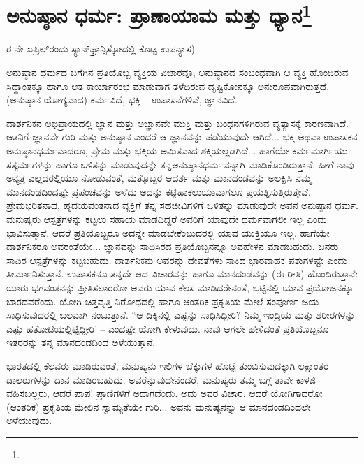 
\chapter[ಅನುಷ್ಠಾನ ಧರ್ಮ: ಪ್ರಾಣಾಯಾಮ ಮತ್ತು ಧ್ಯಾನ]{ಅನುಷ್ಠಾನ ಧರ್ಮ: ಪ್ರಾಣಾಯಾಮ ಮತ್ತು ಧ್ಯಾನ\protect\footnote{}}

\begin{center}
ರ ನೇ ಏಪ್ರಿಲ್‌ರಂದು ಸ್ಯಾನ್‌ಫ್ರಾನ್ಸಿಸ್ಕೋದಲ್ಲಿ ಕೊಟ್ಟ ಉಪನ್ಯಾಸ)
\end{center}

ಅನುಷ್ಠಾನ ಧರ್ಮದ ಬಗೆಗಿನ ಪ್ರತಿಯೊಬ್ಬ ವ್ಯಕ್ತಿಯ ವಿಚಾರವೂ, ಅನುಷ್ಠಾನದ ಸಂಬಂಧವಾಗಿ ಆ ವ್ಯಕ್ತಿ ಹೊಂದಿರುವ ಸಿದ್ದಾಂತಕ್ಕೂ ಹಾಗೂ ಆತ ಕಾರ್ಯಾರಂಭ ಮಾಡುವಾಗ ತಳೆದಿರುವ ದೃಷ್ಟಿಕೋನಕ್ಕೂ ಅನುರೂಪವಾಗಿರುತ್ತದೆ. (ಅನುಷ್ಠಾನ ಯೋಗ್ಯವಾದ) ಕರ್ಮವಿದೆ, ಭಕ್ತಿ – ಉಪಾಸನೆಗಳಿವೆ, ಜ್ಞಾನವಿದೆ.

ದಾರ್ಶನಿಕನ ಅಭಿಪ್ರಾಯದಲ್ಲಿ ಜ್ಞಾನ ಮತ್ತು ಅಜ್ಞಾನವೇ ಮುಕ್ತಿ ಮತ್ತು ಬಂಧನಗಳಿಗಿರುವ ವ್ಯತ್ಯಾಸಕ್ಕೆ ಕಾರಣವಾಗಿದೆ. ಆತನಿಗೆ ಜ್ಞಾನವೇ ಗುರಿ ಮತ್ತು ಅನುಷ್ಠಾನ ಎಂದರೆ ಆ ಜ್ಞಾನವನ್ನು ಪಡೆಯುವುದೇ ಆಗಿದೆ... ಭಕ್ತ ಅಥವಾ ಉಪಾಸಕನ ಅನುಷ್ಠಾನಧರ್ಮವಾದರೂ, ಪ್ರೇಮ ಮತ್ತು ಭಕ್ತಿಯ ಅಮಿತವಾದ ಶಕ್ತಿಯಲ್ಲಡಗಿದೆ... ಹಾಗೆಯೇ ಕರ್ಮಮಾರ್ಗಿಯು ಸತ್ಕರ್ಮಗಳನ್ನು ಹಾಗೂ ಒಳಿತನ್ನು ಮಾಡುವುದನ್ನೇ ತನ್ನ\break ಅನುಷ್ಠಾನಧರ್ಮವನ್ನಾಗಿ ಮಾಡಿಕೊಂಡಿರುತ್ತಾನೆ. ಹೀಗೆ ನಾವು ಅನ್ಯತ್ರ ಎಲ್ಲದರಲ್ಲಿಯೂ ನೋಡುವಂತೆ, ಮತ್ತೊಬ್ಬರ ಆದರ್ಶ ಮತ್ತು ಮಾನದಂಡವನ್ನು ಅಲಕ್ಷಿಸಿ ನಮ್ಮ ಮಾನದಂಡದಿಂದಷ್ಟೇ ಪ್ರಪಂಚವನ್ನು ಅಳೆದು ಅದನ್ನು ಕಟ್ಟಿಹಾಕಲು\break ಯಾವಾಗಲೂ ಪ್ರಯತ್ನಿಸುತ್ತಿರುತ್ತೇವೆ. ಪ್ರೇಮಭರಿತನಾದ, ಹೃದಯವಂತನಾದ ವ್ಯಕ್ತಿಗೆ ತನ್ನ ಸಹಜೀವಿಗಳಿಗೆ ಒಳಿತನ್ನು ಮಾಡುವುದೇ ಅವನ ಅನುಷ್ಠಾನ ಧರ್ಮ. ಮನುಷ್ಯರು ಆಸ್ಪತ್ರೆಗಳನ್ನು ಕಟ್ಟಲು ಸಹಾಯ ಮಾಡದಿದ್ದರೆ ಅವರಿಗೆ ಯಾವುದೇ ಧರ್ಮವಾಗಲೀ ಇಲ್ಲ ಎಂದು ಭಾವಿಸುತ್ತಾನೆ. ಆದರೆ ಪ್ರತಿಯೊಬ್ಬರೂ ಅದನ್ನೇ ಮಾಡಬೇಕೆಂಬುದರಲ್ಲಿ ಯಾವ ಯುಕ್ತಿಯೂ ಇಲ್ಲ. ಹಾಗೆಯೇ ದಾರ್ಶನಿಕರೂ ಅವರಂತೆಯೇ... ಜ್ಞಾನವನ್ನು ಸಾಧಿಸಿರದ ಪ್ರತಿಯೊಬ್ಬನನ್ನೂ ಅವಹೇಳನ ಮಾಡಬಹುದು. ಜನರು  ಸಾವಿರ ಆಸ್ಪತ್ರೆಗಳನ್ನು ಕಟ್ಟಬಹುದು. ದಾರ್ಶನಿಕನು ಅವರನ್ನು ದೇವತೆಗಳು ಸಾಕಿದ ಭಾರವಾಹಕ ಪಶುಗಳಷ್ಟೇ ಎಂದು ತೀರ್ಮಾನಿಸುತ್ತಾನೆ. ಉಪಾಸಕನೂ ತನ್ನದೇ ಆದ ವಿಚಾರವನ್ನು ಹಾಗೂ ಮಾನದಂಡವನ್ನು (ಈ ರೀತಿ) ಹೊಂದಿರುತ್ತಾನೆ: ಯಾರು ಭಗವಂತನನ್ನು ಪ್ರೀತಿಸಲಾರರೋ ಅವರು ಯಾವ ಕೆಲಸ ಮಾಡಿದರೇನಂತೆ, ಒಟ್ಟಿನಲ್ಲಿ ಯಾವ ಪ್ರಯೋಜನಕ್ಕೂ ಬಾರದವರೆಂದು. ಯೋಗಿ ಚಿತ್ತವೃತ್ತಿ ನಿರೋಧದಲ್ಲಿ ಹಾಗೂ ಆಂತರಿಕ ಪ್ರಕೃತಿಯ ಮೇಲೆ ಸಂಪೂರ್ಣ ಜಯ ಸಾಧಿಸುವುದರಲ್ಲಿ ಬಲವಾಗಿ ನಂಬುತ್ತಾನೆ. “ಆ ದಿಕ್ಕಿನಲ್ಲಿ ಎಷ್ಟನ್ನು ಸಾಧಿಸಿದ್ದೀರಿ? ನಿಮ್ಮ ಇಂದ್ರಿಯ ಮತ್ತು ಶರೀರಗಳನ್ನು ಎಷ್ಟು ಹತೋಟಿಯಲ್ಲಿಟ್ಟಿದ್ದೀರಿ' – ಎಂದಷ್ಟೇ ಯೋಗಿ ಕೇಳುವುದು. ನಾವು ಆಗಲೇ ಹೇಳಿದಂತೆ ಪ್ರತಿಯೊಬ್ಬನೂ ಇತರರನ್ನು ತನ್ನ ಮಾನದಂಡದಿಂದ ಅಳೆಯುತ್ತಾನೆ.

\break

ಭಾರತದಲ್ಲಿ ಕೆಲವರು ಮಾಡಿರುವಂತೆ, ಮನುಷ್ಯನು ಇಲಿಗಳ ಬೆಕ್ಕುಗಳ ಹೊಟ್ಟೆ ತುಂಬಿಸುವುದಕ್ಕಾಗಿ ಲಕ್ಷಾಂತರ ಡಾಲರುಗಳನ್ನು ದಾನ ಮಾಡಿರಬಹುದು. ಅವರೆನ್ನುವುದೇನೆಂದರೆ, ಮನುಷ್ಯರು ತಮ್ಮ ಬಗ್ಗೆ ತಾವೇ ಕಾಳಜಿ ವಹಿಸಬಲ್ಲರು, ಆದರೆ ಪಾಪ! ಪ್ರಾಣಿಗಳಿಗೆ ಅದಾಗದೆಂದು. ಅದು ಅವರ ವಿಚಾರ. ಆದರೆ ಯೋಗಿಗಾದರೋ (ಆಂತರಿಕ) ಪ್ರಕೃತಿಯ ಮೇಲಿನ ಸ್ವಾಮ್ಯತೆಯೇ ಗುರಿ... ಅವನು ಮನುಷ್ಯನನ್ನು ಆ ಮಾನದಂಡದಿಂದಲೇ ಅಳೆಯುವುದು.


